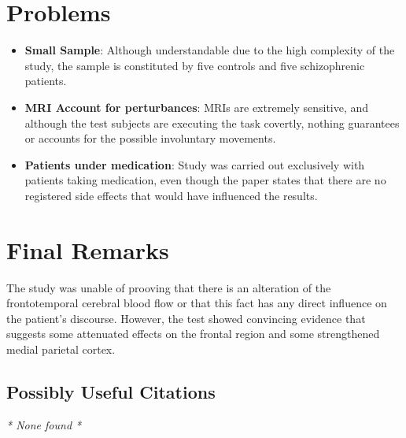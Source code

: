\documentclass{Paper_Summary}
\begin{document}
\section{Problems}
    \begin{itemize}
        \item \textbf{Small Sample}: Although understandable due to the high complexity of the study, the sample is constituted by five controls and five schizophrenic patients.
        \item \textbf{MRI Account for perturbances}: MRIs are extremely sensitive, and although the test subjects are executing the task covertly, nothing guarantees or accounts for the possible involuntary movements.
        \item \textbf{Patients under medication}: Study was carried out exclusively with patients taking medication, even though the paper states that there are no registered side effects that would have influenced the results.
        
    \end{itemize}


\section{Final Remarks}
    
    The study was unable of prooving that there is an alteration of the frontotemporal cerebral blood flow or that this fact has any direct influence on the patient's discourse.
    However, the test showed convincing evidence that suggests some attenuated effects on the frontal region and some strengthened medial parietal cortex.

\breakline

\begin{center}
    \section*{Possibly Useful Citations}
\end{center}
    \emph{* None found *}
\end{document}
